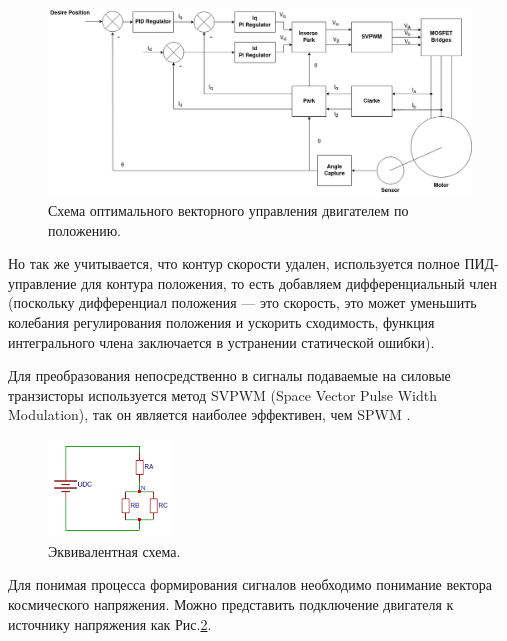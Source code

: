 \begin{figure}[H]
	\centering
	\includegraphics[width=\textwidth]{Src/images/foc pos real.drawio.png}
	\caption{Схема оптимального векторного управления двигателем по положению.}
	\label{ACDFOCALGPOSREAL}
\end{figure}

Но так же учитывается, что контур скорости удален, используется полное ПИД-управление для контура положения, то есть добавляем дифференциальный член (поскольку дифференциал положения — это скорость, это может уменьшить колебания регулирования положения и ускорить сходимость, функция интегрального члена заключается в устранении статической ошибки).



Для преобразования непосредственно в сигналы подаваемые на силовые транзисторы используется метод SVPWM (Space Vector Pulse Width Modulation), так он является наиболее эффективен, чем SPWM \citep{Mirdas2023}.

\begin{figure}[H]
	\centering
	\includegraphics[width=0.3\textwidth]{Src/images/3phasesimpl.png}
	\caption{Эквивалентная схема.}
	\label{ACDFOC3P}
\end{figure}

Для понимая процесса формирования сигналов необходимо понимание вектора космического напряжения. Можно представить подключение двигателя к источнику напряжения как Рис.\ref{ACDFOC3P}.

